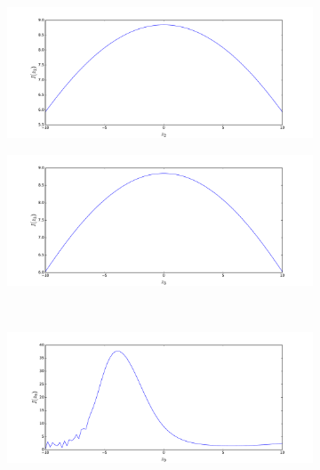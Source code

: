 \begin{figure}
	\begin{subfigure}{.4\textwidth}
		\centering
			\includegraphics[width=1\linewidth]{./figures/basket_call_2d_time_stepping/integrand_plotting/N_8/1d_plots/smoothed_integrand_basket_2D_N_8_z2}
		\caption{}
	\end{subfigure}%
	\begin{subfigure}{.4\textwidth}
		\centering
			\includegraphics[width=1\linewidth]{./figures/basket_call_2d_time_stepping/integrand_plotting/N_8/1d_plots/smoothed_integrand_basket_2D_N_8_z3}
		\caption{}
	\end{subfigure}\\[1ex]
	\begin{subfigure}{.4\textwidth}
		\centering
			\includegraphics[width=1\linewidth]{./figures/basket_call_2d_time_stepping/integrand_plotting/N_8/1d_plots/smoothed_integrand_basket_2D_N_8_z9}

\end{subfigure}
\end{figure}
